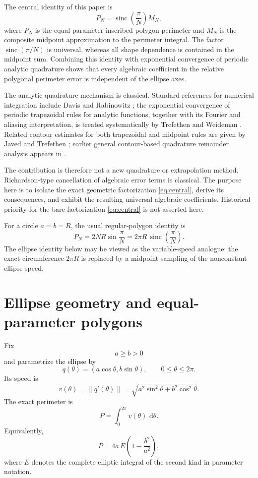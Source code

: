 \documentclass[11pt]{article}
\theoremstyle{definition}
\newcommand{\sinc}{\operatorname{sinc}}
\newcommand{\dd}{\,\mathrm{d}}
\numberwithin{equation}{section}
\begin{document}
The central identity of this paper is
\begin{equation}
\label{eq:central}
P_N=
\sinc\!\left(\frac{\pi}{N}\right)M_N,
\end{equation}
where \(P_N\) is the equal-parameter inscribed polygon perimeter and
\(M_N\) is the composite midpoint approximation to the perimeter
integral.  The factor \(\sinc(\pi/N)\) is universal, whereas all
shape dependence is contained in the midpoint sum.  Combining this
identity with exponential convergence of periodic analytic quadrature
shows that every algebraic coefficient in the relative polygonal
perimeter error is independent of the ellipse axes.

The analytic quadrature mechanism is classical.  Standard references
for numerical integration include Davis and Rabinowitz
\citet{DavisRabinowitz1984}; the exponential convergence of periodic
trapezoidal rules for analytic functions, together with its Fourier
and aliasing interpretation, is treated systematically by Trefethen
and Weideman \citet{TrefethenWeideman2014}.  Related contour estimates
for both trapezoidal and midpoint rules are given by
Javed and Trefethen \citet{JavedTrefethen2014}; earlier general contour-based quadrature remainder analysis appears in \citet{DonaldsonElliott1972}.

The contribution is therefore not a new quadrature or extrapolation
method.  Richardson-type cancellation of algebraic error terms is
classical.  The purpose here is to isolate the exact geometric
factorization \eqref{eq:central}, derive its consequences, and exhibit
the resulting universal algebraic coefficients.  Historical priority
for the bare factorization \eqref{eq:central} is not asserted here.

For a circle \(a=b=R\), the usual regular-polygon identity is
\[
P_N=2NR\sin\frac{\pi}{N}
=
2\pi R\,\sinc\!\left(\frac{\pi}{N}\right).
\]
The ellipse identity below may be viewed as the variable-speed analogue:
the exact circumference \(2\pi R\) is replaced by a midpoint sampling
of the nonconstant ellipse speed.

\section{Ellipse geometry and equal-parameter polygons}

Fix
\[
a\ge b>0
\]
and parametrize the ellipse by
\begin{equation}
\label{eq:q}
q(\theta)=(a\cos\theta,b\sin\theta),
\qquad 0\le\theta\le2\pi.
\end{equation}
Its speed is
\begin{equation}
\label{eq:v}
v(\theta)
=
\|q'(\theta)\|
=
\sqrt{a^2\sin^2\theta+b^2\cos^2\theta}.
\end{equation}
The exact perimeter is
\begin{equation}
\label{eq:P}
P=\int_0^{2\pi}v(\theta)\,\dd\theta.
\end{equation}
Equivalently,
\[
P=4a\,E\!\left(1-\frac{b^2}{a^2}\right),
\]
where \(E\) denotes the complete elliptic integral of the second kind
in parameter notation.
\end{document}
